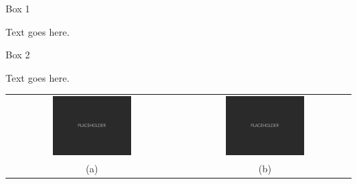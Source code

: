\documentclass[a0paper,portrait]{baposter}
\begin{document}
\begin{poster}
\begin{posterbox}[name=blah,column=0,span=3, headerColorOne=aaublue3, borderColor=aaublue3, boxColorOne=aaublue3, boxheaderheight=-1em]{}

\vspace{-2.5ex}
\textcolor{aaublue2}{\noindent\makebox[\linewidth]{\rule{60cm}{1pt}}}

\end{posterbox}




\begin{posterbox}[name=box1,column=0,row=0, span=3, height=0.097]{Box 1}

Text goes here.

\end{posterbox}



\begin{posterbox}[name=box2,column=0,below=box1, height=0.315]{Box 2}

Text goes here. 

\begin{center}
	\setlength{\tabcolsep}{2pt}
	\begin{tabular}{cc}
		\includegraphics[height=0.36\textwidth, width=0.48\textwidth]{Figures/Placeholder.png}  &
		\includegraphics[height=0.36\textwidth, width=0.48\textwidth]{Figures/Placeholder.png} \\ [-1ex]
		\scriptsize{(a)} & \scriptsize{(b)}
	\end{tabular}
	\vspace{-5pt}
	\label{fig:figlabel}
\end{center}


\end{posterbox}
\end{poster}
\end{document}
